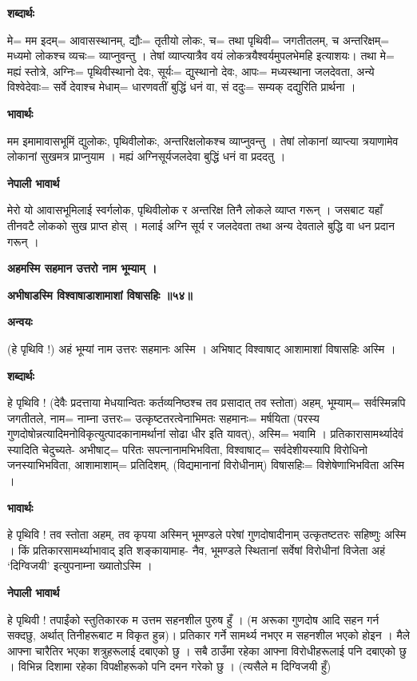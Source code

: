 \documentclass[11pt, a5paper]{article}
\begin{document}
\textbf{शब्दार्थः}

मे= मम इदम्= आवासस्थानम्, द्यौः= तृतीयो लोकः, च= तथा पृथिवी= जगतीतलम्, च अन्तरिक्षम्= मध्यमो लोकश्च व्यचः= व्याप्नुवन्तु । तेषां व्याप्त्यात्रैव वयं लोकत्रयैश्वर्यमुपलभेमहि इत्याशयः। तथा मे‍= मह्यं स्तोत्रे, अग्निः= पृथिवीस्थानो देवः, सूर्यः= द्युस्थानो देवः, आपः= मध्यस्थाना जलदेवता, अन्ये विश्वेदेवाः= सर्वे देवाश्च मेधाम्= धारणवतीं बुद्धिं धनं वा, सं ददुः= सम्यक् दद्युरिति प्रार्थना ।

\textbf{भावार्थः}

मम इमामावासभूमिं द्युलोकः, पृथिवीलोकः, अन्तरिक्षलोकश्च व्याप्नुवन्तु । तेषां लोकानां व्याप्त्या त्रयाणामेव लोकानां सुखमत्र प्राप्नुयाम । मह्यं अग्निसूर्यजलदेवा बुद्धिं धनं वा प्रददतु ।

\textbf{नेपाली भावार्थ}

मेरो यो आवासभूमिलाई स्वर्गलोक, पृथिवीलोक र अन्तरिक्ष तिनै लोकले व्याप्त गरून् । जसबाट यहाँ तीनवटै लोकको सुख प्राप्त होस् । मलाई अग्नि सूर्य र जलदेवता तथा अन्य देवताले बुद्धि वा धन प्रदान गरून् ।

\textbf{अहमस्मि सहमान उत्तरो नाम भूम्याम् ।}

\textbf{अभीषाडस्मि विश्वाषाडाशामाशां विषासहिः ॥५४॥}

\textbf{अन्वयः}

(हे पृथिवि !) अहं भूम्यां नाम उत्तरः सहमानः अस्मि । अभिषाट् विश्वाषाट् आशामाशां विषासहिः अस्मि ।

\textbf{शब्दार्थः}

हे पृथिवि ! (देवैः प्रदत्ताया मेधयान्वितः कर्तव्यनिष्ठश्च तव प्रसादात् तव स्तोता) अहम्, भूम्याम्= सर्वस्मिन्नपि जगतीतले, नाम= नाम्ना उत्तरः= उत्कृष्टतरत्वेनाभिमतः सहमानः= मर्षयिता (परस्य गुणदोषोन्नत्यादिमनोविकृत्युत्पादकानामर्थानां सोढा धीर इति यावत्), अस्मि= भवामि । प्रतिकारासामर्थ्यादेवं स्यादिति चेदुच्यते- अभीषाट्= परितः सपत्नानामभिभविता, विश्वाषाट्= सर्वदेशीयस्यापि विरोधिनो जनस्याभिभविता, आशामाशाम्= प्रतिदिशम्, (विद्यमानानां विरोधीनाम्) विषासहिः= विशेषेणाभिभविता अस्मि ।

\textbf{भावार्थः}

हे पृथिवि ! तव स्तोता अहम्, तव कृपया अस्मिन् भूमण्डले परेषां गुणदोषादीनाम् उत्कृतष्टतरः सहिष्णुः अस्मि । किं प्रतिकारसामर्थ्याभावाद् इति शङ्‍कायामाह- नैव, भूमण्डले स्थितानां सर्वेषां विरोधीनां विजेता अहं ‘दिग्विजयी’ इत्युपनाम्ना ख्यातोऽस्मि ।

\textbf{नेपाली भावार्थ}

हे पृथिवी ! तपाईंको स्तुतिकारक म उत्तम सहनशील पुरुष हुँ । (म अरूका गुणदोष आदि सहन गर्न सक्दछु, अर्थात् तिनीहरूबाट म विकृत हुन्न)। प्रतिकार गर्ने सामर्थ्य नभएर म सहनशील भएको होइन । मैले आफ्ना चारैतिर भएका शत्रुहरूलाई दबाएको छु । सबै ठाउँमा रहेका आफ्ना विरोधीहरूलाई पनि दबाएको छु । विभिन्न दिशामा रहेका विपक्षीहरूको पनि दमन गरेको छु । (त्यसैले म दिग्विजयी हुँ)
\end{document}
